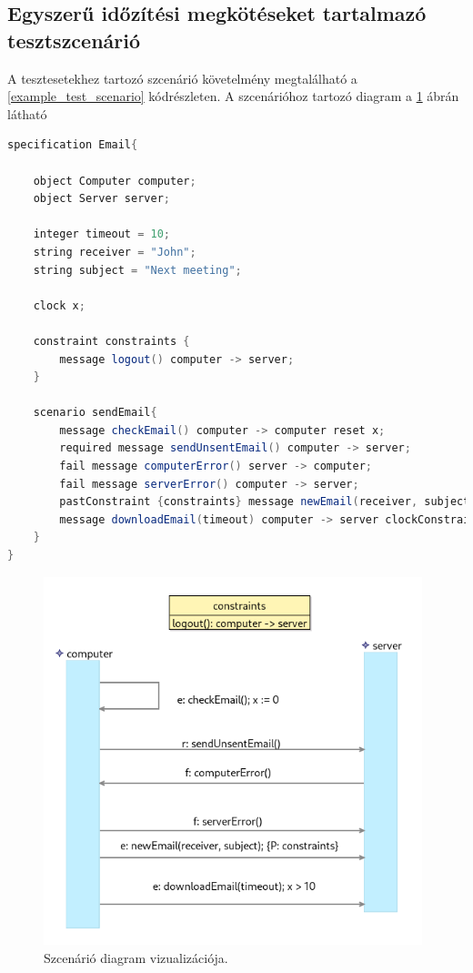 \subsection{Egyszerű időzítési megkötéseket tartalmazó tesztszcenárió}

A tesztesetekhez tartozó szcenárió követelmény megtalálható a \ref{example_test_scenario} kódrészleten.
A szcenárióhoz tartozó diagram a \ref{example_test_scenario_diagram} ábrán látható

\begin{lstlisting}[language=java, frame=single, float=ht!, caption={Tesztesethez tartozó szcenárió szöveges leírása.},captionpos=b,label=example_test_scenario]
specification Email{

    object Computer computer;
    object Server server;

    integer timeout = 10;
    string receiver = "John";
    string subject = "Next meeting";

    clock x;

    constraint constraints {
        message logout() computer -> server;
    }

    scenario sendEmail{
        message checkEmail() computer -> computer reset x;
        required message sendUnsentEmail() computer -> server;
        fail message computerError() server -> computer;
        fail message serverError() computer -> server;
        pastConstraint {constraints} message newEmail(receiver, subject) computer -> server;
        message downloadEmail(timeout) computer -> server clockConstraint {>(x,10)};
    }
}
\end{lstlisting}

\begin{figure}[!ht]
    \centering
    \includegraphics[width=110mm, keepaspectratio]{figures/diagramExample.png}
    \caption{Szcenárió diagram vizualizációja.}
    \label{example_test_scenario_diagram}
\end{figure}

